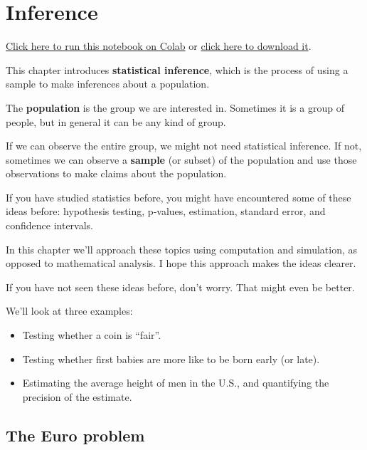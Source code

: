 \hypertarget{inference}{%
\chapter{Inference}\label{inference}}

\href{https://colab.research.google.com/github/AllenDowney/ElementsOfDataScience/blob/master/11_inference.ipynb}{Click
here to run this notebook on Colab} or
\href{https://github.com/AllenDowney/ElementsOfDataScience/raw/master/11_inference.ipynb}{click
here to download it}.

This chapter introduces \textbf{statistical inference}, which is the
process of using a sample to make inferences about a population.

The \textbf{population} is the group we are interested in. Sometimes it
is a group of people, but in general it can be any kind of group.

If we can observe the entire group, we might not need statistical
inference. If not, sometimes we can observe a \textbf{sample} (or
subset) of the population and use those observations to make claims
about the population.

If you have studied statistics before, you might have encountered some
of these ideas before: hypothesis testing, p-values, estimation,
standard error, and confidence intervals.

In this chapter we'll approach these topics using computation and
simulation, as opposed to mathematical analysis. I hope this approach
makes the ideas clearer.

If you have not seen these ideas before, don't worry. That might even be
better.

We'll look at three examples:

\begin{itemize}
\item
  Testing whether a coin is ``fair''.
\item
  Testing whether first babies are more like to be born early (or late).
\item
  Estimating the average height of men in the U.S., and quantifying the
  precision of the estimate.
\end{itemize}

\hypertarget{the-euro-problem}{%
\section{The Euro problem}\label{the-euro-problem}}

